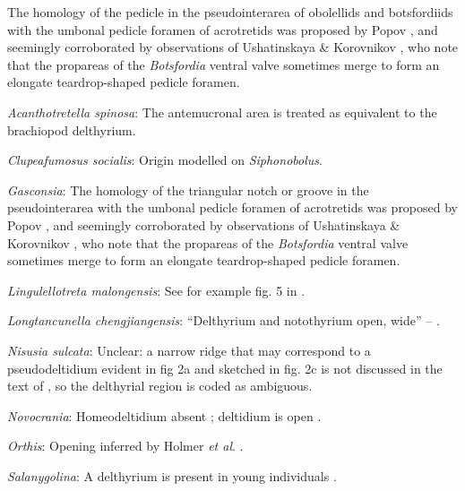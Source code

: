 \documentclass[openany]{book}
\theoremstyle{definition}
\theoremstyle{definition}
\theoremstyle{definition}
\theoremstyle{remark}
\begin{document}
The homology of the pedicle in the pseudointerarea of obolellids and
botsfordiids with the umbonal pedicle foramen of acrotretids was
proposed by Popov \citeyearpar{Popov1992TheCambrian}, and seemingly
corroborated by observations of Ushatinskaya \& Korovnikov
\citeyearpar{Ushatinskaya2016Revisionof}, who note that the propareas of
the \emph{Botsfordia} ventral valve sometimes merge to form an elongate
teardrop-shaped pedicle foramen.

\hypertarget{Acanthotretella_spinosa-coding-106}{}
\emph{Acanthotretella spinosa}: The antemucronal area
\citep{Schwabe2010} is treated as equivalent to the brachiopod
delthyrium.

\hypertarget{Clupeafumosus_socialis-coding-106}{}
\emph{Clupeafumosus socialis}: Origin modelled on \emph{Siphonobolus}.

\hypertarget{Gasconsia-coding-106}{}
\emph{Gasconsia}: The homology of the triangular notch or groove in the
pseudointerarea with the umbonal pedicle foramen of acrotretids was
proposed by Popov \citeyearpar{Popov1992TheCambrian}, and seemingly
corroborated by observations of Ushatinskaya \& Korovnikov
\citeyearpar{Ushatinskaya2016Revisionof}, who note that the propareas of
the \emph{Botsfordia} ventral valve sometimes merge to form an elongate
teardrop-shaped pedicle foramen.

\hypertarget{Lingulellotreta_malongensis-coding-106}{}
\emph{Lingulellotreta malongensis}: See for example fig. 5 in
\citet{Balthasar2009Thebrachiopod}.

\hypertarget{Longtancunella_chengjiangensis-coding-106}{}
\emph{Longtancunella chengjiangensis}: ``Delthyrium and notothyrium
open, wide'' -- \citet{Cooper1976LowerCambrian}.

\hypertarget{Nisusia_sulcata-coding-106}{}
\emph{Nisusia sulcata}: Unclear: a narrow ridge that may correspond to a
pseudodeltidium evident in fig 2a and sketched in fig. 2c is not
discussed in the text of \citet{Zhang2011Theexceptionally}, so the
delthyrial region is coded as ambiguous.

\hypertarget{Novocrania-coding-106}{}
\emph{Novocrania}: Homeodeltidium absent
\citep[p.~153]{Williams2000LinguliformeaCraniiformea}; deltidium is open
\citep[see][fig. 4]{Topper2013Theoldest}.

\hypertarget{Orthis-coding-106}{}
\emph{Orthis}: Opening inferred by Holmer \emph{et al}.
\citeyearpar{Holmer2008TheEarly}.

\hypertarget{Salanygolina-coding-106}{}
\emph{Salanygolina}: A delthyrium is present in young individuals
\citep{Balthasar2004Shellstructure}.
\end{document}
